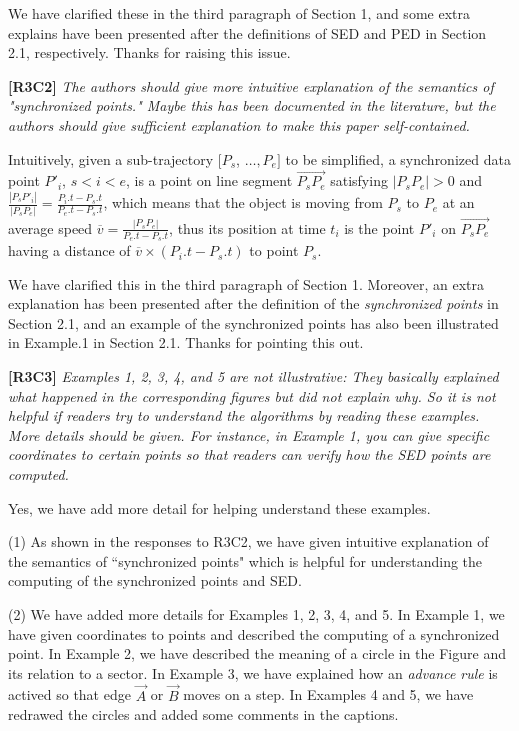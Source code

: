 \documentclass{letter}
\begin{document}
We have clarified these in the third paragraph of Section 1, and some extra explains have been presented after the definitions of SED and PED in Section 2.1, respectively. Thanks for raising this issue.

\textbf{[R3C2]} \emph{The authors should give more intuitive explanation of the semantics of "synchronized points." Maybe this has been documented in the literature, but the authors should give sufficient explanation to make this paper self-contained.}

Intuitively, given a sub-trajectory $[P_s$, $\ldots, P_e]$ to be simplified, a synchronized data point $P'_i$, $s<i<e$, is a point on line segment $\overrightarrow{P_sP_{e}}$ satisfying $|P_sP_e|>0$ and $\frac{|P_sP'_i|}{|P_sP_e|} = \frac{P_i.t - P_s.t}{P_e.t-P_s.t}$, which means that the object is moving from $P_s$ to $P_e$ at an average speed $\overline{v} = \frac{|P_sP_e|}{P_e.t-P_s.t}$, thus its position at time $t_i$ is the point $P'_i$ on $\overrightarrow{P_sP_{e}}$ having a distance of $\overline{v}\times (P_i.t-P_s.t)$ to point $P_s$.

We have clarified this in the third paragraph of Section 1. Moreover, an extra explanation has been presented after the definition of the \emph{synchronized points} in Section 2.1, and an example of the synchronized points has also been illustrated in Example.1 in Section 2.1.
Thanks for pointing this out.



\textbf{[R3C3]} \emph{Examples 1, 2, 3, 4, and 5 are not illustrative: They basically explained what happened in the corresponding figures but did not explain why. So it is not helpful if readers try to understand the algorithms by reading these examples. More details should be given. For instance, in Example 1, you can give specific coordinates to certain points so that readers can verify how the SED points are computed.}

Yes, we have add more detail for helping understand these examples.

(1) As shown in the responses to R3C2, we have given intuitive explanation of the semantics of ``synchronized points" which is helpful for understanding the computing of the synchronized points and SED.

(2) We have added more details for Examples 1, 2, 3, 4, and 5. In Example 1, we have given coordinates to points and described the computing of a synchronized point. In Example 2, we have described the meaning of a circle in the Figure and its relation to a sector. In Example 3, we have explained how an \emph{advance rule} is actived so that edge $\overrightarrow{A}$ or $\overrightarrow{B}$ moves on a step. In Examples 4 and 5, we have redrawed the circles and added some comments in the captions.
\end{document}
